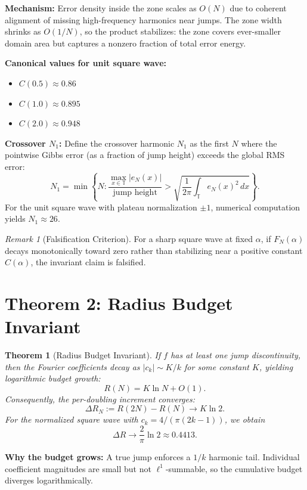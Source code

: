 \documentclass[11pt,letterpaper]{article}
\newtheorem{theorem}{Theorem}
\theoremstyle{remark}
\newtheorem*{remark}{Remark}
\newcommand{\Torus}{\mathbb{T}}
\begin{document}
\textbf{Mechanism:} Error density inside the zone scales as $O(N)$ due to coherent alignment of missing high-frequency harmonics near jumps. The zone width shrinks as $O(1/N)$, so the product stabilizes: the zone covers ever-smaller domain area but captures a nonzero fraction of total error energy.

\textbf{Canonical values for unit square wave:}
\begin{itemize}[nosep]
\item $C(0.5) \approx 0.86$
\item $C(1.0) \approx 0.895$
\item $C(2.0) \approx 0.948$
\end{itemize}

\textbf{Crossover $N_1$:} Define the crossover harmonic $N_1$ as the first $N$ where the pointwise Gibbs error (as a fraction of jump height) exceeds the global RMS error:
\[
N_1 = \min \left\{ N : \frac{\max_{x \in \Torus} |e_N(x)|}{\text{jump height}} > \sqrt{\frac{1}{2\pi} \int_{\Torus} e_N(x)^2 \, dx} \right\}.
\]
For the unit square wave with plateau normalization $\pm 1$, numerical computation yields $N_1 \approx 26$.

\begin{remark}[Falsification Criterion]
For a sharp square wave at fixed $\alpha$, if $F_N(\alpha)$ decays monotonically toward zero rather than stabilizing near a positive constant $C(\alpha)$, the invariant claim is falsified.
\end{remark}

\section{Theorem 2: Radius Budget Invariant}

\begin{theorem}[Radius Budget Invariant]
\label{thm:radius}
If $f$ has at least one jump discontinuity, then the Fourier coefficients decay as $|c_k| \sim K/k$ for some constant $K$, yielding logarithmic budget growth:
\[
R(N) = K \ln N + O(1).
\]
Consequently, the per-doubling increment converges:
\[
\Delta R_N := R(2N) - R(N) \to K \ln 2.
\]
For the normalized square wave with $c_k = 4/(\pi(2k-1))$, we obtain
\[
\Delta R \to \frac{2}{\pi} \ln 2 \approx 0.4413.
\]
\end{theorem}

\textbf{Why the budget grows:} A true jump enforces a $1/k$ harmonic tail. Individual coefficient magnitudes are small but not $\ell^1$-summable, so the cumulative budget diverges logarithmically.
\end{document}
